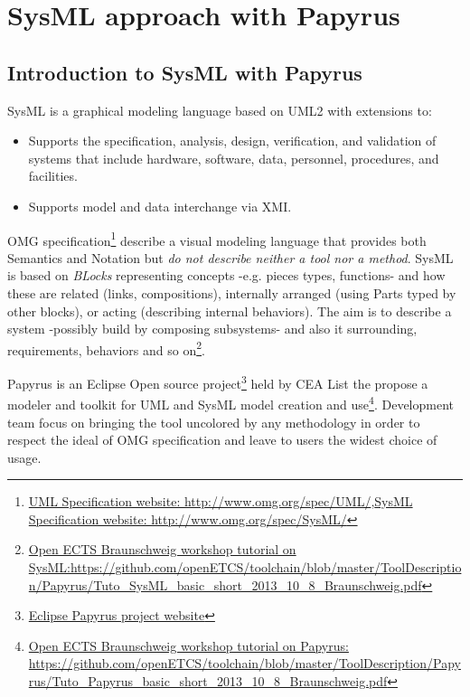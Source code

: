 
\section{SysML approach with Papyrus}

\subsection{Introduction to SysML with Papyrus}

SysML is a graphical modeling language based on UML2 with extensions to:
\begin{itemize}
	\item Supports the specification, analysis, design, verification, and validation of systems that include hardware, software, data, personnel, procedures, and facilities.
	\item Supports model and data interchange via XMI.
\end{itemize}
OMG specification\footnote{\href{http://www.omg.org/spec/UML/}{UML Specification website: http://www.omg.org/spec/UML/},\newline \href{http://www.omg.org/spec/SysML/} {SysML Specification website: http://www.omg.org/spec/SysML/}} describe a visual modeling language that provides both Semantics and Notation but \emph{do not describe neither a tool nor a method}.
SysML is based on \emph{BLocks} representing concepts -e.g. pieces types, functions- and how these are related (links, compositions), internally arranged (using Parts typed by other blocks), or acting (describing internal behaviors). The aim is to describe a system -possibly build by composing subsystems- and also it surrounding, requirements, behaviors and so on\footnote{\href{https://github.com/openETCS/toolchain/blob/master/ToolDescription/Papyrus/Tuto_SysML_basic_short_2013_10_8_Braunschweig.pdf}{Open ECTS Braunschweig workshop tutorial on SysML:\newline https://github.com/openETCS/toolchain/blob/master/ToolDescription/Papyrus/Tuto\_SysML\_basic\_short\_2013\_10\_8\_Braunschweig.pdf}}.

Papyrus is an Eclipse Open source project\footnote{\href{http://www.eclipse.org/papyrus/}{Eclipse Papyrus project website}} held by CEA List the propose a modeler and toolkit for UML and SysML model creation and use\footnote{\href{https://github.com/openETCS/toolchain/blob/master/ToolDescription/Papyrus/Tuto_Papyrus_basic_short_2013_10_8_Braunschweig.pdf}{Open ECTS Braunschweig workshop tutorial on Papyrus: \newline https://github.com/openETCS/toolchain/blob/master/ToolDescription/Papyrus/Tuto\_Papyrus\_basic\_short\_2013\_10\_8\_Braunschweig.pdf}}. Development team focus on bringing the tool uncolored by any methodology in order to respect the ideal of OMG specification and leave to users the widest choice of usage.

